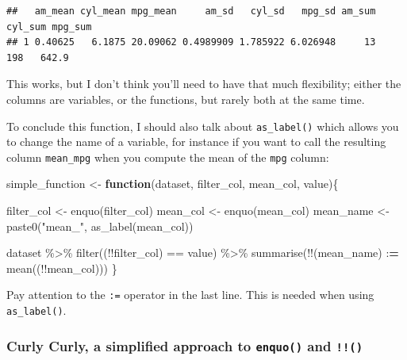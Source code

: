 \documentclass[
]{article}
\newenvironment{Shaded}{\begin{snugshade}}{\end{snugshade}}
\newcommand{\ControlFlowTok}[1]{\textcolor[rgb]{0.13,0.29,0.53}{\textbf{#1}}}
\newcommand{\ErrorTok}[1]{\textcolor[rgb]{0.64,0.00,0.00}{\textbf{#1}}}
\newcommand{\FunctionTok}[1]{\textcolor[rgb]{0.00,0.00,0.00}{#1}}
\newcommand{\NormalTok}[1]{#1}
\newcommand{\OtherTok}[1]{\textcolor[rgb]{0.56,0.35,0.01}{#1}}
\newcommand{\SpecialCharTok}[1]{\textcolor[rgb]{0.00,0.00,0.00}{#1}}
\newcommand{\StringTok}[1]{\textcolor[rgb]{0.31,0.60,0.02}{#1}}
\begin{document}
\begin{verbatim}
##   am_mean cyl_mean mpg_mean     am_sd   cyl_sd   mpg_sd am_sum cyl_sum mpg_sum
## 1 0.40625   6.1875 20.09062 0.4989909 1.785922 6.026948     13     198   642.9
\end{verbatim}

This works, but I don't think you'll need to have that much flexibility; either the columns
are variables, or the functions, but rarely both at the same time.

To conclude this function, I should also talk about \texttt{as\_label()} which allows you to change the
name of a variable, for instance if you want to call the resulting column \texttt{mean\_mpg} when you
compute the mean of the \texttt{mpg} column:

\begin{Shaded}
\begin{Highlighting}[]
\NormalTok{simple\_function }\OtherTok{\textless{}{-}} \ControlFlowTok{function}\NormalTok{(dataset, filter\_col, mean\_col, value)\{}

\NormalTok{  filter\_col }\OtherTok{\textless{}{-}} \FunctionTok{enquo}\NormalTok{(filter\_col)}
\NormalTok{  mean\_col }\OtherTok{\textless{}{-}} \FunctionTok{enquo}\NormalTok{(mean\_col)}
\NormalTok{  mean\_name }\OtherTok{\textless{}{-}} \FunctionTok{paste0}\NormalTok{(}\StringTok{"mean\_"}\NormalTok{, }\FunctionTok{as\_label}\NormalTok{(mean\_col))}
  
\NormalTok{  dataset }\SpecialCharTok{\%\textgreater{}\%}
    \FunctionTok{filter}\NormalTok{((}\SpecialCharTok{!!}\NormalTok{filter\_col) }\SpecialCharTok{==}\NormalTok{ value) }\SpecialCharTok{\%\textgreater{}\%}
    \FunctionTok{summarise}\NormalTok{(}\SpecialCharTok{!!}\NormalTok{(mean\_name) }\SpecialCharTok{:}\ErrorTok{=} \FunctionTok{mean}\NormalTok{((}\SpecialCharTok{!!}\NormalTok{mean\_col)))}
\NormalTok{\}}
\end{Highlighting}
\end{Shaded}

Pay attention to the \texttt{:=} operator in the last line. This is needed when using \texttt{as\_label()}.

\hypertarget{curly-curly-a-simplified-approach-to-enquo-and}{%
\subsubsection{\texorpdfstring{Curly Curly, a simplified approach to \texttt{enquo()} and \texttt{!!()}}{Curly Curly, a simplified approach to enquo() and !!()}}\label{curly-curly-a-simplified-approach-to-enquo-and}}
\end{document}
